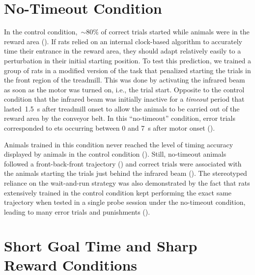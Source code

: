 \section{No-Timeout Condition}
\label{ch:time:nto}

In the control condition,~$\sim$80\% of correct trials started while animals were in the reward area ().
If rats relied on an internal clock-based algorithm to accurately time their entrance in the reward area, they should adapt relatively easily to a perturbation in their initial starting position.
To test this prediction, we trained a group of rats in a modified version of the task that penalized starting the trials in the front region of the treadmill.
This was done by activating the infrared beam as soon as the motor was turned on, i.e., the trial start.
Opposite to the control condition that the infrared beam was initially inactive for a \emph{timeout} period that lasted~1.5~s after treadmill onset to allow the animals to be carried out of the reward area by the conveyor belt.
In this ``no-timeout'' condition, error trials corresponded to \glspl{et} occurring between 0 and 7~s after motor onset ().

Animals trained in this condition never reached the level of timing accuracy displayed by animals in the control condition ().
Still, no-timeout animals followed a front-back-front trajectory () and correct trials were associated with the animals starting the trials just behind the infrared beam ().
The stereotyped reliance on the wait-and-run strategy was also demonstrated by the fact that rats extensively trained in the control condition kept performing the exact same trajectory when tested in a single probe session under the no-timeout condition, leading to many error trials and punishments ().


\section[Short~GT \& Sharp Conditions]{Short Goal Time and Sharp Reward Conditions}
\label{ch:time:shortGT}

